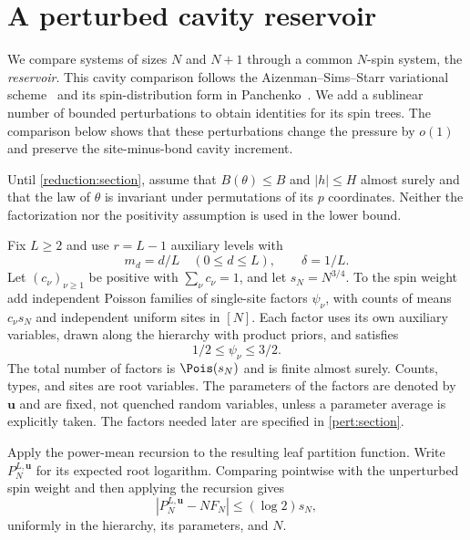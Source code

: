 \section{A perturbed cavity reservoir}\label{cavity:section}

We compare systems of sizes $N$ and $N+1$ through a common $N$-spin
system, the \emph{reservoir}. This cavity comparison follows the
Aizenman--Sims--Starr variational scheme~\cite{ASS03} and its
spin-distribution form in Panchenko~\cite[Section~2.2]{Pan13}. We add a sublinear number of bounded perturbations
to obtain identities for its spin trees. The comparison below shows
that these perturbations change the pressure by $o(1)$ and preserve
the site-minus-bond cavity increment.

Until \cref{reduction:section}, assume that $B(\theta)\le B$ and
$|h|\le H$ almost surely and that the law of $\theta$ is invariant under
permutations of its $p$ coordinates. Neither the factorization nor the
positivity assumption is used in the lower bound.

Fix $L\ge2$ and use $r=L-1$ auxiliary levels with
\begin{equation}\label{cavity:grid}
 m_d=d/L\quad(0\le d\le L),\qquad\delta=1/L.
\end{equation}
Let $(c_\nu)_{\nu\ge1}$ be positive with $\sum_\nu c_\nu=1$, and let
$s_N=N^{3/4}$. To the spin weight add independent Poisson families of
single-site factors $\psi_\nu$, with counts of means $c_\nu s_N$ and
independent uniform sites in $[N]$. Each factor uses its own auxiliary
variables, drawn along the hierarchy with product priors, and satisfies
\begin{equation}\label{cavity:factor-bounds}
 1/2\le\psi_\nu\le3/2.
\end{equation}
The total number of factors is $\Pois(s_N)$ and is finite almost surely.
Counts, types, and sites are root variables. The parameters of the factors
are denoted by $\mathbf u$ and are fixed, not quenched random variables,
unless a parameter average is explicitly taken. The factors needed later
are specified in \cref{pert:section}.

Apply the power-mean recursion to the resulting leaf partition function.
Write $P_N^{L,\mathbf u}$ for its expected root logarithm. Comparing
pointwise with the unperturbed spin weight and then applying the recursion
gives
\begin{equation}\label{cavity:negligible}
 |P_N^{L,\mathbf u}-NF_N|\le (\log2)s_N,
\end{equation}
uniformly in the hierarchy, its parameters, and $N$.

